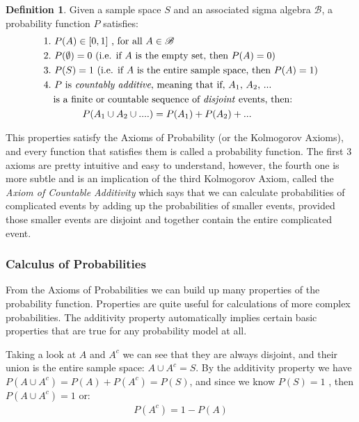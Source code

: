 \documentclass[
  oneside,
  11pt, a4paper,
  footinclude=true,
  headinclude=true,
  cleardoublepage=empty
]{scrbook}
\theoremstyle{definition}
\newtheorem{definition}{Definition}[section]
\theoremstyle{definition}
\begin{document}
                \begin{definition}{Given a sample space $S$ and an associated sigma algebra $\mathscr{B}$, a probability function $P$ satisfies:}
                \begin{align*}
                & 1.\ P(A) \in [0, 1]\ \text{, for all}\ A \in \mathscr{B} \\
                & 2.\ P(\emptyset) = 0\ \text{(i.e. if $A$ is the empty set, then $P(A) = 0$)} \\
                & 3.\ P(S) = 1\ \text{(i.e. if $A$ is the entire sample space, then $P(A) = 1$)} \\
                & 4.\ \text{$P$ is \emph{countably additive}, meaning that if, $A_1$, $A_2$, ...} \\ 
                & \quad \text{is a finite or countable sequence of \emph{disjoint} events, then:}\\
                & \qquad\qquad P(A_1 \cup A_2 \cup ....) = P(A_1) + P(A_2) + \text{...} 
                \end{align*}{}
                \end{definition}{}
                
                This properties satisfy the Axioms of Probability (or the Kolmogorov Axioms), and every function that satisfies them is called a probability function. The first 3 axioms are pretty intuitive and easy to understand, however, the fourth one is more subtle and is an implication of the third Kolmogorov Axiom, called the \emph{Axiom of Countable Additivity} which says that we can calculate probabilities of complicated events by adding up the probabilities of smaller events, provided those smaller events are disjoint and together contain the entire complicated event.
        
        \subsubsection{Calculus of Probabilities}
            
            From the Axioms of Probabilities we can build up many properties of the probability function. Properties are quite useful for calculations of more complex probabilities. The additivity property automatically implies certain basic properties that are true for any probability model at all.
            
            Taking a look at $A$ and $A^c$ we can see that they are always disjoint, and their union is the entire sample space: $A \cup A^c = S$. By the additivity property we have $P(A \cup A^c) = P(A) + P(A^c) = P(S)$, and since we know $P(S) = 1$ , then $P(A \cup A^c) = 1$ or:
            \begin{align}
                P(A^c) = 1 - P(A)
            \end{align}{}
            
\end{document}
